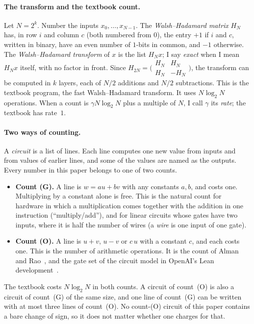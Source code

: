 \documentclass[10pt]{article}
\theoremstyle{remark}
\newcommand{\cntG}{\textup{(G)}}
\newcommand{\cntO}{\textup{(O)}}
\renewcommand{\lg}{\log_2}
\begin{document}
\paragraph{The transform and the textbook count.}
\enlargethispage{\baselineskip}%
Let $N=2^k$. Number the inputs $x_0,\dots,x_{N-1}$. The \emph{Walsh--Hadamard matrix} $H_N$ has, in row $i$ and
column $c$ (both numbered from $0$), the entry $+1$ if $i$ and $c$, written in binary, have an even number of
$1$-bits in common, and $-1$ otherwise. The \emph{Walsh--Hadamard transform} of $x$ is the list $H_N x$; I say
\emph{exact} when I mean $H_N x$ itself, with no factor in front. Since
$H_{2N}=\bigl(\begin{smallmatrix}H_N&H_N\\H_N&-H_N\end{smallmatrix}\bigr)$, the transform can be computed in $k$
layers, each of $N/2$ additions and $N/2$ subtractions. This is the textbook program, the fast
Walsh--Hadamard transform. It uses $N\lg N$ operations. When a count is $\gamma N\lg N$ plus a multiple
of $N$, I call $\gamma$ its \emph{rate}; the textbook has rate~$1$.

\paragraph{Two ways of counting.}
A \emph{circuit} is a list of lines. Each line computes one new value from inputs and from values of
earlier lines, and some of the values are named as the outputs. Every number in this paper belongs to one
of two counts.
\begin{itemize}\setlength{\itemsep}{1pt}\setlength{\parskip}{0pt}
\item \textbf{Count \cntG.} A line is $w=a u+b v$ with any constants $a,b$, and costs one. Multiplying by a
constant alone is free. This is the natural count for hardware in which a multiplication comes together
with the addition in one instruction (``multiply/add''), and for linear circuits whose gates have two
inputs, where it is half the number of wires (a \emph{wire} is one input of one gate).
\item \textbf{Count \cntO.} A line is $u+v$, $u-v$ or $c\,u$ with a constant $c$, and each costs one. This is
the number of arithmetic operations. It is the count of Alman and Rao~\cite{AR}, and the gate set of the
circuit model in OpenAI's Lean development~\cite{OAI1}.
\end{itemize}
The textbook costs $N\lg N$ in both counts. A circuit of count~\cntO{} is also a circuit of count~\cntG{} of the
same size, and one line of count~\cntG{} can be written with at most three lines of count~\cntO. No count-\cntO{}
circuit of this paper contains a bare change of sign, so it does not matter whether one charges for that.
\end{document}
